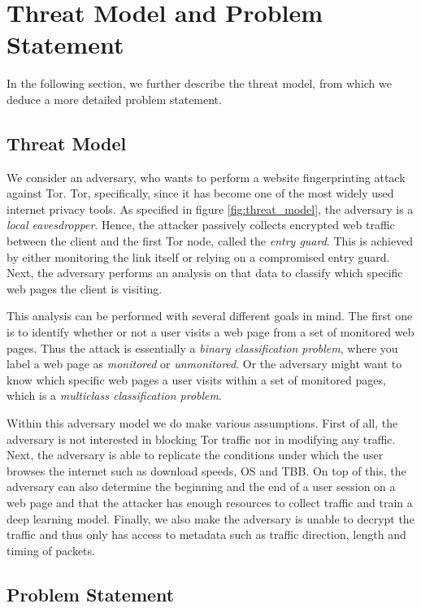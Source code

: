 \chapter{Threat Model and Problem Statement}

In the following section, we further describe the threat model, from which we deduce a more detailed problem statement.

\section{Threat Model} \label{sec:threat-model}

We consider an adversary, who wants to perform a website fingerprinting attack against Tor.
Tor, specifically, since it has become one of the most widely used internet privacy tools.
As specified in figure \ref{fig:threat_model}, the adversary is a \textit{local eavesdropper}.
Hence, the attacker passively collects encrypted web traffic between the client and the first Tor node, called the \textit{entry guard}.
This is achieved by either monitoring the link itself or relying on a compromised entry guard.
Next, the adversary performs an analysis on that data to classify which specific web pages the client is visiting.

This analysis can be performed with several different goals in mind.
The first one is to identify whether or not a user visits a web page from a set of monitored web pages.
Thus the attack is essentially a \textit{binary classification problem}, where you label a web page as \textit{monitored} or \textit{unmonitored}.
Or the adversary might want to know which specific web pages a user visits within a set of monitored pages, which is a \textit{multiclass classification problem}.

Within this adversary model we do make various assumptions.
First of all, the adversary is not interested in blocking Tor traffic nor in modifying any traffic.
Next, the adversary is able to replicate the conditions under which the user browses the internet such as download speeds, OS and TBB.
On top of this, the adversary can also determine the beginning and the end of a user session on a web page and that the attacker has enough resources to collect traffic and train a deep learning model.
Finally, we also make the adversary is unable to decrypt the traffic and thus only has access to metadata such as traffic direction, length and timing of packets.

\section{Problem Statement}

